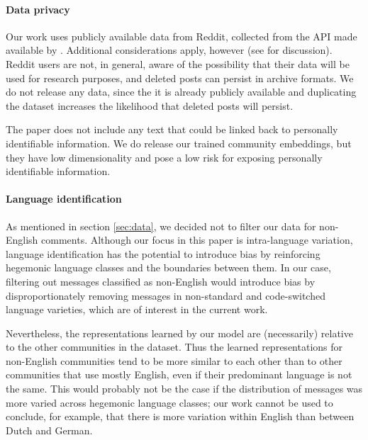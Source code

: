 \documentclass[11pt]{article}
\begin{document}
\paragraph{Data privacy}
Our work uses publicly available data from Reddit,
collected from the API made available by \citet{Baumgartner2020}.
Additional considerations apply, however 
(see \citet{Gliniecka2021} for discussion). Reddit users are not,
in general, aware of the possibility that their data will be used 
for research purposes, and deleted posts can persist in archive formats.
We do not release any data, since the it is already publicly available 
and duplicating the dataset increases the likelihood that deleted 
posts will persist.

The paper does not include any text that could be linked back to 
personally identifiable information.
We do release our trained community embeddings, but they have 
low dimensionality and pose a low risk for exposing personally
identifiable information.

\paragraph{Language identification}
As mentioned in section \cref{sec:data}, we decided not to filter our data for non-English 
comments.
Although our focus in this paper is intra-language variation, 
language identification has the potential to introduce bias by reinforcing hegemonic
language classes and the boundaries between them.
In our case, filtering out messages classified as non-English would 
introduce bias by disproportionately removing messages in
non-standard and code-switched language varieties,
which are of interest in the current work.

Nevertheless, the representations learned by our model are (necessarily)
relative to the other communities in the dataset. 
Thus the learned representations for non-English communities tend to be more similar to each other 
than to other communities that use mostly English, even if their predominant language is not the same.
This would probably not be the case if the distribution of messages 
was more varied across hegemonic language classes; our work cannot be used to conclude,
for example, that there is more variation within English than between Dutch and German.
\end{document}

